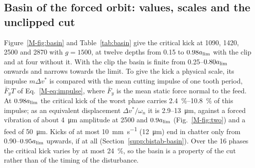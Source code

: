 \subsection{Basin of the forced orbit: values, scales and the unclipped cut}\label{supp:std-bistab-basin}

Figure~\ref{M-fig:basin} and Table~\ref{tab:basin} give the critical kick at 1090, 1420, 2500 and \SI{2870}{\rpm} with $g=1500$, at twelve depths from 0.15 to $0.98a_{\lim}$ with the clip and at four without it. With the clip the basin is finite from 0.25--$0.80a_{\lim}$ onwards and narrows towards the limit. To give the kick a physical scale, its impulse $m\Delta v^*$ is compared with the mean cutting impulse of one tooth period, $\bar F_yT$ of Eq.~\eqref{M-eq:impulse}, where $\bar F_y$ is the mean static force normal to the feed. At $0.98a_{\lim}$ the critical kick of the worst phase carries \SIrange{2.4}{10.8}{\percent} of this impulse; as an equivalent displacement $\Delta v^*/\omega_n$ it is 2.9--\SI{13}{\micro\metre}, against a forced vibration of about \SI{4}{\micro\metre} amplitude at \SI{2500}{\rpm} and $0.9a_{\lim}$ (Fig.~\ref{M-fig:two}) and a feed of \SI{50}{\micro\metre}. Kicks of at most \SI{10}{\milli\metre\per\second} (\SI{12}{\micro\metre}) end in chatter only from 0.90--$0.95a_{\lim}$ upwards, if at all (Section~\ref{supp:bistab-basin}). Over the 16 phases the critical kick varies by at most \SI{24}{\percent}, so the basin is a property of the cut rather than of the timing of the disturbance.

